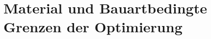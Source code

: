 \chapter{Material und Bauartbedingte Grenzen der Optimierung}\label{cha:Material und Bauartbedingte Grenzen der Optimierung}

